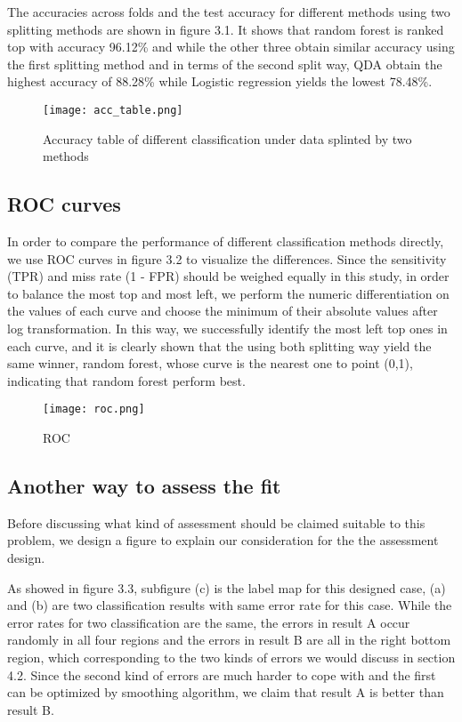 \documentclass[11pt]{scrartcl} %
\begin{document}
The accuracies across folds and the test accuracy for different methods using two splitting methods are shown in figure 3.1. It shows that  random forest is ranked top with accuracy 96.12\% and while the other three obtain similar accuracy using the first splitting method and in terms of the second split way, QDA obtain the highest accuracy of 88.28\% while Logistic regression yields the lowest 78.48\%.\\

\begin{figure}[htb]
	\centering
	\texttt{[image: acc\_table.png]} %
	\caption{Accuracy table of different classification under data splinted by two methods}
\end{figure}

\subsection{ROC curves}
In order to compare the performance of different classification methods directly, we use ROC curves in figure 3.2 to visualize the differences. Since the sensitivity (TPR) and miss rate (1 - FPR) should be weighed equally in this study, in order to balance the most top and most left, we perform the numeric differentiation on the values of each curve and choose the minimum of their absolute values after log transformation. In this way, we successfully identify the most left top ones in each curve, and it is clearly shown that the using both splitting way yield the same winner, random forest, whose curve is the nearest one to point (0,1), indicating that random forest perform best.\\

\begin{figure}[htb]
	\centering
	\texttt{[image: roc.png]} %
	\caption{ROC}
\end{figure}

\subsection{Another way to assess the fit}
Before discussing what kind of assessment should be claimed suitable to this problem, we design a figure to explain our consideration for the the assessment design.

As showed in figure 3.3, subfigure (c) is the label map for this designed case, (a) and (b) are two classification results with same error rate for this case. While the error rates for two classification are the same, the errors in result A occur randomly in all four regions and the errors in result B are all in the right bottom region, which corresponding to the two kinds of errors we would discuss in section 4.2. Since the second kind of errors are much harder to cope with and the first can be optimized by smoothing algorithm, we claim that result A is better than result B.
\end{document}
